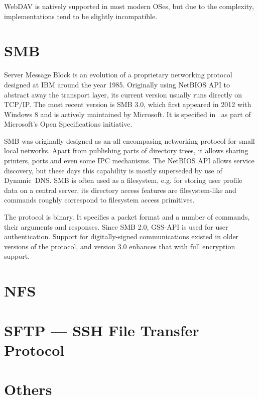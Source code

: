 WebDAV is natively supported in most modern OSes, but due to the complexity, implementations tend to be
slightly incompatible.

\section{SMB}

Server Message Block is an evolution of a proprietary networking protocol designed at IBM around the year
1985. Originally using NetBIOS API to abstract away the transport layer, its current version usually runs
directly on TCP/IP.  The most recent version is SMB 3.0, which first appeared in 2012 with Windows 8 and is
actively maintained by Microsoft. It is specified in~\cite{mssmb2} as part of Microsoft's Open Specifications
initiative.

SMB was originally designed as an all-encompasing networking protocol for small local networks. Apart from
publishing parts of directory trees, it allows sharing printers, ports and even some IPC mechanisms. The
NetBIOS API allows service discovery, but these days this capability is mostly superseded by use of
Dynamic~DNS. SMB is often used as a filesystem, e.g. for storing user profile data on a central server, its
directory access features are filesystem-like and commands roughly correspond to filesystem access primitives.

The protocol is binary. It specifies a packet format and a number of commands, their arguments and responses.
Since SMB 2.0, GSS-API is used for user authentication. Support for digitally-signed communications existed in
older versions of the protocol, and version 3.0 enhances that with full encryption support.

\section{NFS}

\section{SFTP --- SSH File Transfer Protocol}

\section{Others}

